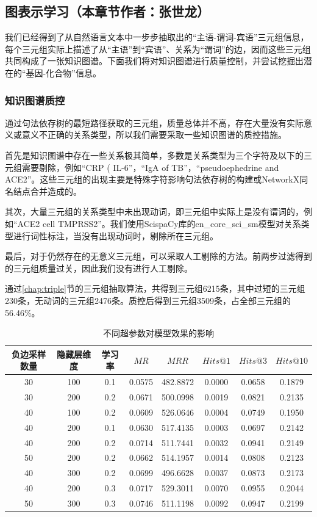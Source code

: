 \documentclass[twocolumn]{article}
\begin{document}
\subsection{图表示学习（本章节作者：张世龙）\label{chap:embedding}}
我们已经得到了从自然语言文本中一步步抽取出的“主语-谓词-宾语”三元组信息，每个三元组实际上描述了从“主语”到“宾语”、关系为“谓词”的边，因而这些三元组共同构成了一张知识图谱。下面我们将对知识图谱进行质量控制，并尝试挖掘出潜在的“基因-化合物”信息。\par

\subsubsection{知识图谱质控\label{chap:kgqc}}
通过句法依存树的最短路径获取的三元组，质量总体并不高，存在大量没有实际意义或意义不正确的关系类型，所以我们需要采取一些知识图谱的质控措施。\par
首先是知识图谱中存在一些关系极其简单，多数是关系类型为三个字符及以下的三元组需要剔除，例如“CRP ( IL-6”，“IgA of TB”，“pseudoephedrine and ACE2”。这些三元组的出现主要是特殊字符影响句法依存树的构建或NetworkX同名结点合并造成的。\par
其次，大量三元组的关系类型中未出现动词，即三元组中实际上是没有谓词的，例如“ACE2 cell TMPRSS2”。我们使用ScispaCy库的en\_core\_sci\_sm模型对关系类型进行词性标注，当没有出现动词时，剔除所在三元组。\par
最后，对于仍然存在的无意义三元组，可以采取人工剔除的方法。前两步过滤得到的三元组质量过关，因此我们没有进行人工剔除。\par
通过\ref{chap:triple}节的三元组抽取算法，共得到三元组6215条，其中过短的三元组230条，无动词的三元组2476条。质控后得到三元组3509条，占全部三元组的56.46\%。\par

\begin{table}[htb]
	\centering
	\caption{不同超参数对模型效果的影响}
	\begin{tabular}{cccccccc}
		\hline
		负边采样数量 & 隐藏层维度 & 学习率 & $MR$ & $MRR$ & $Hits@1$ & $Hits@3$ & $Hits@10$\\
		\hline
		30 & 100 & 0.1 & 0.0575 & 482.8872 & 0.0000 & 0.0658 & 0.1879 \\
		30 & 200 & 0.2 & 0.0671 & 500.0998 & 0.0019 & 0.0821 & 0.2135 \\
		40 & 100 & 0.2 & 0.0609 & 526.0646 & 0.0004 & 0.0749 & 0.1950 \\
		40 & 200 & 0.1 & 0.0630 & 517.4135 & 0.0003 & 0.0697 & 0.2142 \\
		40 & 200 & 0.2 & 0.0714 & 511.7441 & 0.0032 & 0.0941 & 0.2149 \\
		50 & 200 & 0.2 & 0.0662 & 514.1957 & 0.0014 & 0.0808 & 0.2123 \\
		40 & 300 & 0.2 & 0.0699 & 496.6628 & 0.0037 & 0.0873 & 0.2173 \\
		40 & 200 & 0.3 & 0.0717 & 529.3011 & 0.0070 & 0.0955 & 0.2044 \\
		50 & 300 & 0.3 & 0.0746 & 511.1198 & 0.0092 & 0.0947 & 0.2199 \\
		\hline
	\end{tabular}
	\label{tab:hyper}
\end{table}
\end{document}

